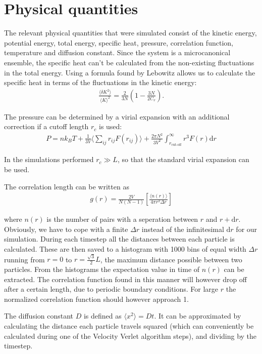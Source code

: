 \section{Physical quantities}
The relevant physical quantities that were simulated consist of the kinetic energy, potential energy, total energy, specific heat, pressure, correlation function, temperature and diffusion constant. Since the system is a microcanonical ensemble, the specific heat can't be calculated from the non-existing fluctuations in the total energy\cite{jos}. Using a formula found by Lebowitz \cite{lebowitz1967ensemble} allows us to calculate the specific heat in terms of the fluctuations in the kinetic energy:
\begin{gather*}
    \frac{\langle \delta K^2\rangle}{\langle K\rangle^2}=\frac{2}{3N}\left( 1-\frac{3N}{2C_v}\right).
\end{gather*}

The pressure can be determined by a virial expansion with an additional correction if a cutoff length $r_c$ is used:
\begin{gather*}
    P = nk_BT + \frac{1}{3V}\Big \langle \sum_{ij} r_{ij}F(r_{ij})\Big \rangle + \frac{2\pi N^2}{3V^2}\int_{r_{\text{cut-off}}}^{\infty}r^3 F(r) \text{d}r
\end{gather*}

In the simulations performed $r_c \gg L$, so that the standard virial expansion can be used.

The correlation length can be written as
\begin{gather*}
    g(r)=\frac{2V}{N(N-1)}\left[\frac{\langle n(r)\rangle}{4\pi r^2\Delta r}\right]
\end{gather*}

where $n(r)$ is the number of pairs with a seperation between $r$ and $r + \mathrm{d}r$. Obviously, we have to cope with a finite $\Delta r$ instead of the infinitesimal $\mathrm{d}r$ for our simulation. During each timestep all the distances between each particle is calculated. These are then saved to a histogram with 1000 bins of equal width $\Delta r$ running from $r = 0$ to $r = \frac{\sqrt{3}}{2}L$, the maximum distance possible between two particles. From the histograms the expectation value in time of $n(r)$ can be extracted. The correlation function found in this manner will however drop off after a certain length, due to periodic boundary conditions. For large $r$ the normalized correlation function should however approach 1.

The diffusion constant $D$ is defined as $\langle x^2\rangle = Dt$. It can be approximated by calculating the distance each particle travels squared (which can conveniently be calculated during one of the Velocity Verlet algorithm steps), and dividing by the timestep.